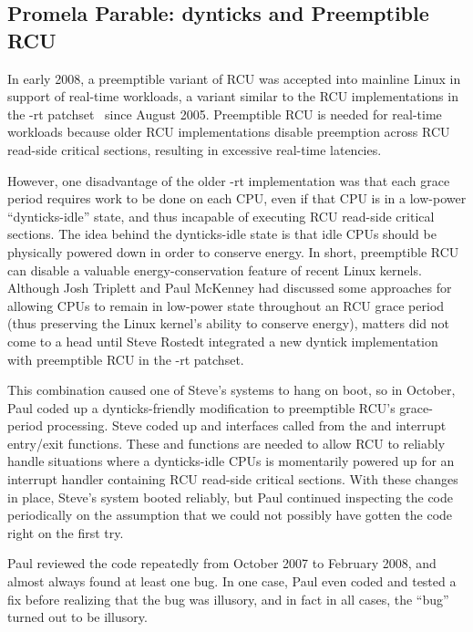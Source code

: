 
\subsection{Promela Parable: dynticks and Preemptible RCU}
\label{sec:formal:Promela Parable: dynticks and Preemptible RCU}

In early 2008, a preemptible variant of RCU was accepted into
mainline Linux in support of real-time workloads,
a variant similar to the RCU implementations in
the -rt patchset~\cite{IngoMolnar05a}
since August 2005.
Preemptible RCU is needed for real-time workloads because older
RCU implementations disable preemption across RCU read-side
critical sections, resulting in excessive real-time latencies.

However, one disadvantage of the older -rt implementation
was that each grace period
requires work to be done on each CPU, even if that CPU is in a low-power
``dynticks-idle'' state,
and thus incapable of executing RCU read-side critical sections.
The idea behind the dynticks-idle state is that idle CPUs
should be physically powered down in order to conserve energy.
In short, preemptible RCU can disable a valuable energy-conservation
feature of recent Linux kernels.
Although Josh Triplett and Paul McKenney
had discussed some approaches for allowing
CPUs to remain in low-power state throughout an RCU grace period
(thus preserving the Linux kernel's ability to conserve energy), matters
did not come to a head until Steve Rostedt integrated a new dyntick
implementation with preemptible RCU in the -rt patchset.

This combination caused one of Steve's systems to hang on boot, so in
October, Paul coded up a dynticks-friendly modification to preemptible RCU's
grace-period processing.
Steve coded up  and 
interfaces called from the
 and  interrupt
entry/exit functions.
These  and 
functions are needed to allow RCU to reliably handle situations where
a dynticks-idle CPUs is momentarily powered up for an interrupt
handler containing RCU read-side critical sections.
With these changes in place, Steve's system booted reliably,
but Paul continued inspecting the code periodically on the assumption
that we could not possibly have gotten the code right on the first try.

Paul reviewed the code repeatedly from October 2007 to February 2008,
and almost always found at least one bug.
In one case, Paul even coded and tested a fix before realizing that the
bug was illusory, and in fact in all cases, the ``bug'' turned out to be
illusory.

